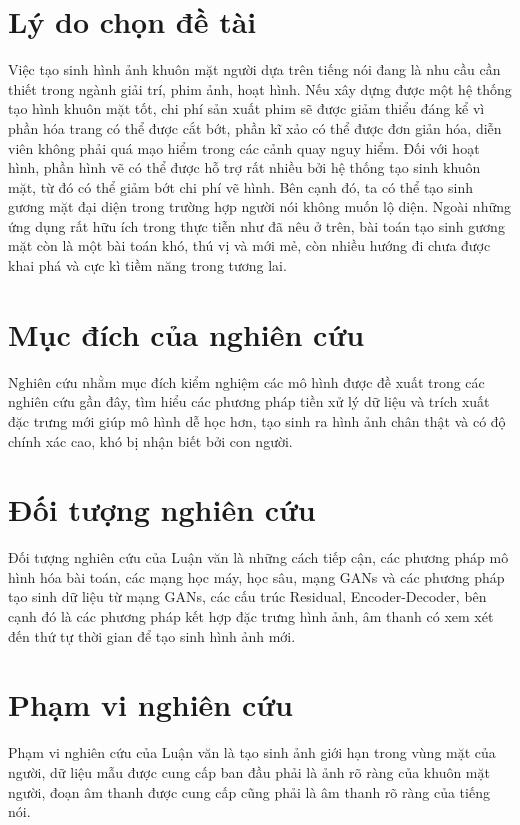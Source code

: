 \section{\texorpdfstring{Lý do chọn đề tài}{Why}}
Việc tạo sinh hình ảnh khuôn mặt người dựa trên tiếng nói đang là nhu cầu cần thiết trong ngành giải trí, phim ảnh, hoạt hình. Nếu xây dựng được một hệ thống tạo hình khuôn mặt tốt, chi phí sản xuất phim sẽ được giảm thiểu đáng kể vì phần hóa trang có thể được cắt bớt, phần kĩ xảo có thể được đơn giản hóa, diễn viên không phải quá mạo hiểm trong các cảnh quay nguy hiểm. Đối với hoạt hình, phần hình vẽ có thể được hỗ trợ rất nhiều bởi hệ thống tạo sinh khuôn mặt, từ đó có thể giảm bớt chi phí vẽ hình. Bên cạnh đó, ta có thể tạo sinh gương mặt đại diện trong trường hợp người nói không muốn lộ diện. Ngoài những ứng dụng rất hữu ích trong thực tiễn như đã nêu ở trên, bài toán tạo sinh gương mặt còn là một bài toán khó, thú vị và mới mẻ, còn nhiều hướng đi chưa được khai phá và cực kì tiềm năng trong tương lai.

\section{\texorpdfstring{Mục đích của nghiên cứu}{Target}}
Nghiên cứu nhằm mục đích kiểm nghiệm các mô hình được đề xuất trong các nghiên cứu gần đây, tìm hiểu các phương pháp tiền xử lý dữ liệu và trích xuất đặc trưng mới giúp mô hình dễ học hơn, tạo sinh ra hình ảnh chân thật và có độ chính xác cao, khó bị nhận biết bởi con người.

\section{\texorpdfstring{Đối tượng nghiên cứu}{Objective}}
Đối tượng nghiên cứu của Luận văn là những cách tiếp cận, các phương pháp mô hình hóa bài toán, các mạng học máy, học sâu, mạng GANs và các phương pháp tạo sinh dữ liệu từ mạng GANs, các cấu trúc Residual, Encoder-Decoder, bên cạnh đó là các phương pháp kết hợp đặc trưng hình ảnh, âm thanh có xem xét đến thứ tự thời gian để tạo sinh hình ảnh mới.

\section{\texorpdfstring{Phạm vi nghiên cứu}{Research}}
Phạm vi nghiên cứu của Luận văn là tạo sinh ảnh giới hạn trong vùng mặt của người, dữ liệu mẫu được cung cấp ban đầu phải là ảnh rõ ràng của khuôn mặt người, đoạn âm thanh được cung cấp cũng phải là âm thanh rõ ràng của tiếng nói.

